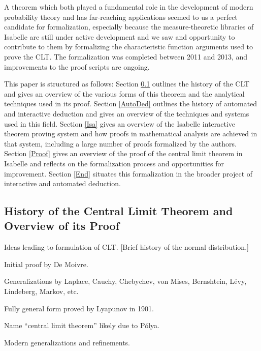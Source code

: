 \documentclass{amsart}
\theoremstyle{definition}
\theoremstyle{remark}
\begin{document}

A theorem which both played a fundamental role in the development of modern probability theory and has far-reaching applications seemed to us a perfect candidate for formalization, especially because the measure-theoretic libraries of Isabelle are still under active development and we saw and opportunity to contribute to them by formalizing the characteristic function arguments used to prove the CLT. The formalization was completed between 2011 and 2013, and improvements to the proof scripts are ongoing.

This paper is structured as follows: Section \ref{CLT} outlines the history of the CLT and gives an overview of the various forms of this theorem and the analytical techniques used in its proof. Section \ref{AutoDed} outlines the history of automated and interactive deduction and gives an overview of the techniques and systems used in this field. Section \ref{Isa} gives an overview of the Isabelle interactive theorem proving system and how proofs in mathematical analysis are achieved in that system, including a large number of proofs formalized by the authors. Section \ref{Proof} gives an overview of the proof of the central limit theorem in Isabelle and reflects on the formalization process and opportunities for improvement. Section \ref{End} situates this formalization in the broader project of interactive and automated deduction.

\subsection{History of the Central Limit Theorem and Overview of its Proof} \label{CLT}



Ideas leading to formulation of CLT. [Brief history of the normal distribution.]

Initial proof by De Moivre.

Generalizations by Laplace, Cauchy, Chebychev, von Mises, Bernshtein, L\'evy, Lindeberg, Markov, etc.

Fully general form proved by Lyapunov in 1901.

Name ``central limit theorem'' likely due to P\'olya.

Modern generalizations and refinements.
\end{document}
